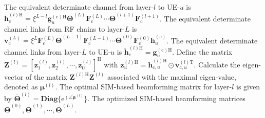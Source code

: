 \documentclass[lettersize,journal]{IEEEtran}
\theoremstyle{remark}
\begin{document}
\begin{algorithm}[!t]
\begin{algorithmic}[1]
                The equivalent determinate channel from layer-$l$ to UE-$u$ is  $\ddot{\mathbf{h}}_\mathrm{c}^{(l)\mathrm{H}}=\xi^{L-l}
                \mathbf{g}_u^{(\mathrm{c})\mathrm{H}}
                \overline{\mathbf{\Theta}}^{(L)}\mathbf{F}_\mathrm{c}^{(L)}
                \cdots\overline{\mathbf{\Theta}}^{(l+1)}\mathbf{F}_\mathrm{c}^{(l+1)}$.
            \STATE
                The equivalent determinate channel links from RF chains to layer-$L$ is   $\ddot{\mathbf{v}}_\mathrm{c}^{(L)}=\xi^L\mathbf{F}_\mathrm{c}^{(L)}
                \overline{\mathbf{\Theta}}^{(L-1)}\mathbf{F}_\mathrm{c}^{(L-1)}\cdots
                \overline{\mathbf{\Theta}}^{(0)}\mathbf{F}_\mathrm{c}^{(0)}
                \overline{\mathbf{h}}_u^{(\mathrm{c})}$.
            \STATE
                The equivalent determinate channel links from layer-$L$ to UE-$u$ is  $\ddot{\mathbf{h}}_\mathrm{c}^{(l)\mathrm{H}}=\mathbf{g}_u^{(\mathrm{c})\mathrm{H}}$.
        \ENDIF
    \ENDFOR
        \STATE
            Define the matrix $\mathbf{Z}^{(l)}=[\mathbf{z}_1^{(l)},\mathbf{z}_2^{(l)},\cdots,
             \mathbf{z}_U^{(l)}]^{\mathrm{H}}$ with $\mathbf{z}_u^{(l)\mathrm{H}}=\ddot{\mathbf{h}}_{\mathrm{c},u}^{(l)\mathrm{H}}
            \odot\ddot{\mathbf{v}}_{\mathrm{c},u}^{(l)\mathrm{T}}$.
        \STATE
            Calculate the eigen-vector of the matrix $\mathbf{Z}^{(l)\mathrm{H}}\mathbf{Z}^{(l)}$ associated with the maximal eigen-value, denoted as $\boldsymbol{\mu}^{(l)}$.
        \STATE
            The optimal SIM-based beamforming matrix for layer-$l$ is given by $\overline{\mathbf{\Theta}}^{(l)}=\mathbf{Diag}
            \{{\mathrm{e}^{\jmath\angle\boldsymbol{\mu}^{(l)}}}\}$.
    \ENDFOR
\ENSURE
    The optimized SIM-based beamforming matrices $\overline{\mathbf{\Theta}}^{(0)},\overline{\mathbf{\Theta}}^{(1)},\cdots,
    \overline{\mathbf{\Theta}}^{(L)}$.
\end{algorithmic}
\end{algorithm}
\end{document}
